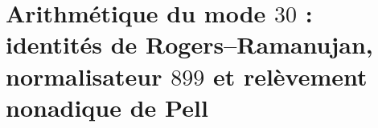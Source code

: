 \chapter{Arithmétique du mode \(30\) : identités de Rogers--Ramanujan, normalisateur \(899\) et relèvement nonadique de Pell}
\label{chap:p3-final:46:modo_30_pell}



